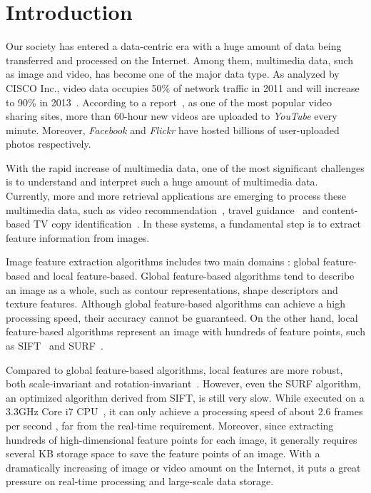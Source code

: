 \section{Introduction}
\label{sec:introduction}

Our society has entered a data-centric era with a huge amount of data being transferred and processed on the Internet. Among them, multimedia data, such as image and video, has become one of the major data type. As analyzed by CISCO Inc., video data occupies 50\% of network traffic in 2011 and will increase to 90\% in 2013~\cite{index2010forecast}.  According to a report~\cite{jansohn2009detecting}, as one of the most popular video sharing sites, more than 60-hour new videos are uploaded to \emph{YouTube} every minute. Moreover, \emph{Facebook} and \emph{Flickr} have hosted billions of user-uploaded photos respectively.

With the rapid increase of multimedia data, one of the most significant challenges is to understand and interpret such a huge amount of multimedia data. Currently, more and more retrieval applications are emerging to process these multimedia data, such as video recommendation~\cite{videorecommendation2007}, travel guidance~\cite{travelguidance2010} and content-based TV copy identification~\cite{tvidentify2003}. In these systems, a fundamental step is to extract feature information from images. 

Image feature extraction algorithms includes two main domains : global feature-based and local feature-based. Global feature-based algorithms tend to describe an image as a whole, such as contour representations, shape descriptors and texture features. Although global feature-based algorithms can achieve a high processing speed, their accuracy cannot be guaranteed. On the other hand, local feature-based algorithms represent  an image with hundreds of feature points, such as SIFT~\cite{lowe1999object,lowe2004distinctive} and SURF~\cite{Bay2006SURF,Evans20009OpenSURF}. 

Compared to global feature-based algorithms, local features are more robust, both scale-invariant and rotation-invariant~\cite{mikolajczyk2005performance}\cite{Bauer2007Evaluation}. However, even the SURF algorithm, an optimized algorithm derived from SIFT, is still very slow. While executed on a 3.3GHz Core i7 CPU~\cite{Fang2011ispass}, it can only achieve a processing speed of  about 2.6 frames per second , far from the real-time requirement. Moreover, since extracting hundreds of high-dimensional feature points for each image, it generally requires several KB storage space to save the feature points of an image. With a dramatically increasing of image or video amount on the Internet, it puts a great pressure on real-time processing and large-scale data storage.

